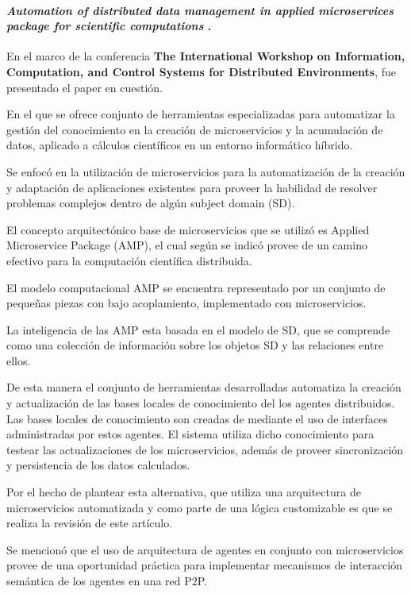 \paragraph{
    \textbf{\emph{Automation of distributed data management in applied 
                    microservices package for scientific computations
            }
    }
    \cite{oparin_automation_2020}.
}

En el marco de la conferencia 
\textbf{The International Workshop on Information, Computation, and Control Systems for Distributed Environments}, 
fue presentado el paper en cuestión. 

En el que se ofrece conjunto de herramientas especializadas para automatizar la gestión del conocimiento en
la creación de microservicios y la acumulación de datos, aplicado a 
cálculos científicos en un entorno informático híbrido.

Se enfocó en la utilización de microservicios para la automatización de la creación y adaptación de aplicaciones existentes
para proveer la habilidad de resolver problemas complejos dentro de algún subject domain (SD).

El concepto arquitectónico base de microservicios que se utilizó es Applied Microservice Package (AMP),
el cual según se indicó provee de un camino efectivo para la computación científica distribuida.

El modelo computacional AMP se encuentra representado por un conjunto de pequeñas piezas con bajo acoplamiento, 
implementado con microservicios.

La inteligencia de las AMP esta basada en el modelo de SD, 
que se comprende como una colección de información sobre los objetos SD y las relaciones entre ellos.

De esta manera el conjunto de herramientas desarrolladas automatiza la creación y actualización
de las bases locales de conocimiento del los agentes distribuidos. Las bases locales de conocimiento 
son creadas de mediante el uso de interfaces administradas por estos agentes. 
El sistema utiliza dicho conocimiento para testear las actualizaciones de los microservicios, 
además de proveer sincronización y persistencia de los datos calculados.
 
Por el hecho de plantear esta alternativa, que utiliza una arquitectura de microservicios automatizada y como parte de una 
lógica customizable es que se realiza la revisión de este artículo.


Se mencionó que el uso de arquitectura de agentes en conjunto con microservicios provee de una oportunidad práctica 
para implementar mecanismos de interacción semántica de los agentes en una red P2P. 

